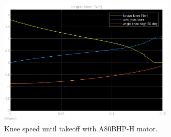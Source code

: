 \begin{figure}[h]
    \centering
    \includegraphics[width=0.75\textwidth]{Images/joint_speed_A80.eps}
    \caption{Knee speed until takeoff with A80BHP-H motor.}
    \label{fig:joint_speed_A80BHM}
\end{figure}
